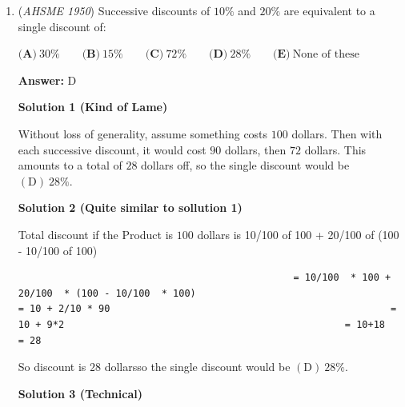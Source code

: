 \begin{enumerate}
\textbf{Solution}

If the sidelengths of the cubes are expressed as $a, b,$ and $c,$ then we can write three equations:

 
 \[ab=12, bc=8, ac=6.\]

 The volume is $abc.$ Notice symmetry in the equations. We can find $abc$ my multiplying all the equations and taking the positive square root.

 
 \begin{align*} (ab)(bc)(ac) &= (12)(8)(6)\\ a^2b^2c^2 &= 576\\ abc &= \boxed{\mathrm{(B)}\ 24} \end{align*}




	\item (\textit{AHSME 1950}) Successive discounts of $10\%$ and $20\%$ are equivalent to a single discount of:


 $\textbf{(A)}\ 30\%\qquad\textbf{(B)}\ 15\%\qquad\textbf{(C)}\ 72\%\qquad\textbf{(D)}\ 28\%\qquad\textbf{(E)}\ \text{None of these}$

 \textbf{Answer: }D



\textbf{Solution 1 (Kind of Lame)}

Without loss of generality, assume something costs $100$ dollars. Then with each successive discount, it would cost $90$ dollars, then $72$ dollars. This amounts to a total of $28$ dollars off, so the single discount would be $\boxed{\mathrm{(D)}\ 28\%.}$




\textbf{Solution 2 (Quite similar to sollution 1)}

Total discount if the Product is $100$ dollars  is  10/100 of 100 +  20/100 of (100 - 10/100 of 100)

 \begin{verbatim}
												= 10/100  * 100 +  20/100  * (100 - 10/100  * 100)                                                  = 10 + 2/10 * 90                                                 = 10 + 9*2                                                 = 10+18                                                 = 28
\end{verbatim}

So discount is $28$ dollarsso the single discount would be $\boxed{\mathrm{(D)}\ 28\%.}$




\textbf{Solution 3 (Technical)}


\end{enumerate}
